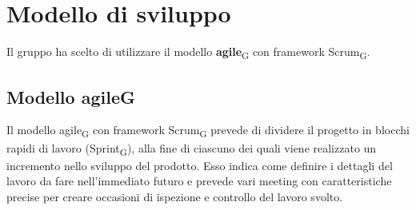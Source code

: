 \section{Modello di sviluppo}
Il gruppo ha scelto di utilizzare il modello \textbf{agile}\textsubscript{G} con framework Scrum\textsubscript{G}.

\subsection{Modello agile{G}}
Il modello agile\textsubscript{G} con framework Scrum\textsubscript{G} prevede di dividere il progetto in blocchi rapidi di lavoro (Sprint\textsubscript{G}),
alla fine di ciascuno dei quali viene realizzato un incremento nello sviluppo del prodotto. 
Esso indica come definire i dettagli del lavoro da fare nell'immediato futuro e prevede 
vari meeting con caratteristiche precise per creare occasioni di ispezione e controllo del lavoro svolto.

